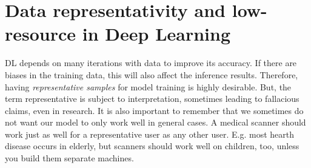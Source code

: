 \documentclass[10pt,twocolumn,letterpaper]{article}
\begin{document}
\section{Data representativity and low-resource in Deep Learning}\label{sec:representative}

\gls{DL} depends on many iterations with data to improve its accuracy. If there are biases in the training data, this will also affect the inference results. Therefore, having \textit{representative samples} for model training is highly desirable. But, the term representative is subject to interpretation, sometimes leading to fallacious claims, even in research. It is also important to remember that we sometimes do not want our model to only work well in general cases. A medical scanner should work just as well for a representative user as any other user. E.g. most hearth disease occurs in elderly, but scanners should work well on children, too, unless you build them separate machines.
\end{document}

